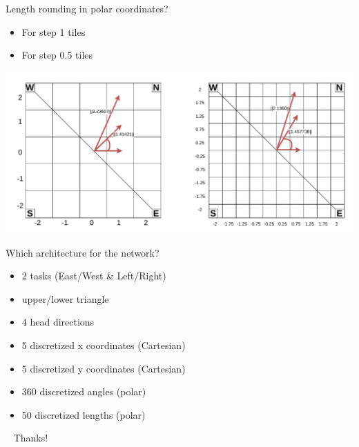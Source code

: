 \documentclass[bigger]{beamer}
\begin{document}
\begin{frame}[label={sec:org1b5354a}]{Length rounding in polar coordinates?}
\begin{itemize}
\item For step 1 tiles
\item For step 0.5 tiles
\end{itemize}
\begin{center}
\includegraphics[width=.9\linewidth]{img/polar-discretized-length.drawio.pdf}
\end{center}
\end{frame}
\begin{frame}[label={sec:org5e64c86}]{Which architecture for the network?}
\begin{itemize}
\item 2 tasks (East/West \& Left/Right)
\item upper/lower triangle
\item 4 head directions
\item 5 discretized x coordinates (Cartesian)
\item 5 discretized y coordinates (Cartesian)
\item 360 discretized angles (polar)
\item 50 discretized lengths (polar)
\end{itemize}
\end{frame}
\begin{frame}[label={sec:orgc57e944},standout]{~}
Thanks!
\end{frame}
\end{document}
